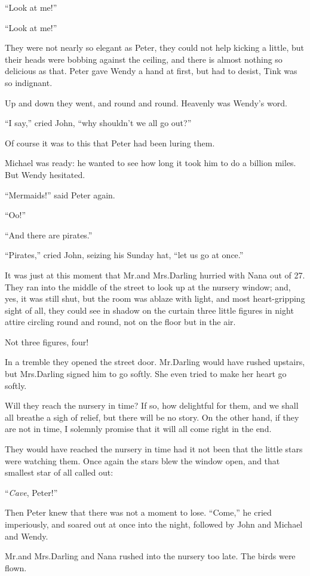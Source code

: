 “Look at me!”

“Look at me!”

They were not nearly so elegant as Peter, they could not help kicking a little,
but their heads were bobbing against the ceiling,
and there is almost nothing so delicious as that.
Peter gave Wendy a hand at first, but had to desist, Tink was so indignant.

Up and down they went, and round and round.
Heavenly was Wendy’s word.

“I say,” cried John, “why shouldn’t we all go out?”

Of course it was to this that Peter had been luring them.

Michael was ready:
he wanted to see how long it took him to do a billion miles.
But Wendy hesitated.

“Mermaids!\@” said Peter again.

“Oo!”

“And there are pirates.”

“Pirates,” cried John, seizing his Sunday hat, “let us go at once.”

It was just at this moment that Mr.\@ and Mrs.\@ Darling hurried with Nana out of 27.
They ran into the middle of the street to look up at the nursery window;
and, yes, it was still shut,
but the room was ablaze with light,
and most heart-gripping sight of all,
they could see in shadow on the curtain three little figures in night attire circling round and round,
not on the floor but in the air.

Not three figures, four!

In a tremble they opened the street door.
Mr.\@ Darling would have rushed upstairs, but Mrs.\@ Darling signed him to go softly.
She even tried to make her heart go softly.

Will they reach the nursery in time?
If so, how delightful for them, and we shall all breathe a sigh of relief, but there will be no story.
On the other hand, if they are not in time, I solemnly promise that it will all come right in the end.

They would have reached the nursery in time had it not been that the little stars were watching them.
Once again the stars blew the window open, and that smallest star of all called out:

“\emph{Cave}, Peter!”

Then Peter knew that there was not a moment to lose.
“Come,” he cried imperiously, and soared out at once into the night,
followed by John and Michael and Wendy.

Mr.\@ and Mrs.\@ Darling and Nana rushed into the nursery too late.
The birds were flown.

\endinput
